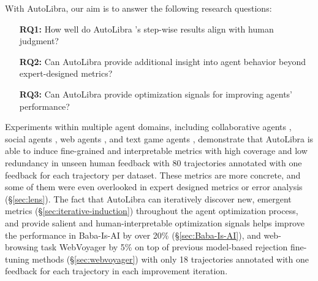 With AutoLibra, our aim is to answer the following research questions:

\begin{itemize}\setlength\itemsep{0em}
	\item[\textbf{RQ1:}] How well do AutoLibra 's step-wise results align with human judgment? %

	\item[\textbf{RQ2:}] Can AutoLibra provide additional insight into agent behavior beyond expert-designed metrics?

	\item[\textbf{RQ3:}] Can AutoLibra provide optimization signals for 
        improving agents' performance?
\end{itemize}

Experiments within multiple agent domains, including collaborative
agents \citep{shao2024collaborative}, social agents \citep{zhousotopia}, web agents
\citep{zhouwebarena,he2024webvoyager}, and text game agents \citep{paglieri2024balrog,cloos2024babaaibreakrules},
demonstrate that AutoLibra is able to induce fine-grained and interpretable metrics
with high coverage and low redundancy in unseen human feedback with 80 trajectories
annotated with one feedback for each trajectory per dataset. These metrics are
more concrete, and some of them were even overlooked in expert designed metrics or
error analysis (\S\ref{sec:lens}). The fact that AutoLibra can iteratively discover
new, emergent metrics (\S\ref{sec:iterative-induction}) throughout the agent optimization
process, and provide salient and human-interpretable optimization signals helps
improve the performance in Baba-Is-AI by over 20\% (\S\ref{sec:Baba-Is-AI}), and
web-browsing task WebVoyager by 5\% on top of previous model-based rejection
fine-tuning methods (\S\ref{sec:webvoyager}) with only 18 trajectories annotated
with one feedback for each trajectory in each improvement iteration.

